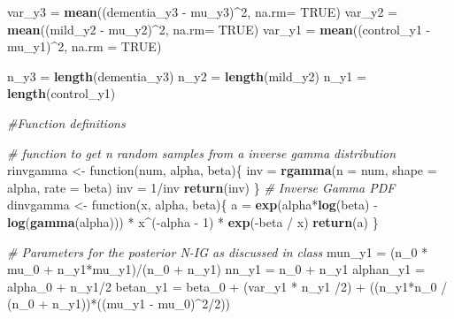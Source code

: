 \documentclass[]{article}
\newenvironment{Shaded}{\begin{snugshade}}{\end{snugshade}}
\newcommand{\KeywordTok}[1]{\textcolor[rgb]{0.13,0.29,0.53}{\textbf{{#1}}}}
\newcommand{\DataTypeTok}[1]{\textcolor[rgb]{0.13,0.29,0.53}{{#1}}}
\newcommand{\DecValTok}[1]{\textcolor[rgb]{0.00,0.00,0.81}{{#1}}}
\newcommand{\StringTok}[1]{\textcolor[rgb]{0.31,0.60,0.02}{{#1}}}
\newcommand{\CommentTok}[1]{\textcolor[rgb]{0.56,0.35,0.01}{\textit{{#1}}}}
\newcommand{\OtherTok}[1]{\textcolor[rgb]{0.56,0.35,0.01}{{#1}}}
\newcommand{\NormalTok}[1]{{#1}}
\begin{document}
\begin{Shaded}
\begin{Highlighting}[]
\NormalTok{var_y3 =}\StringTok{ }\KeywordTok{mean}\NormalTok{((dementia_y3 -}\StringTok{ }\NormalTok{mu_y3)^}\DecValTok{2}\NormalTok{, }\DataTypeTok{na.rm=} \OtherTok{TRUE}\NormalTok{)}
\NormalTok{var_y2 =}\StringTok{ }\KeywordTok{mean}\NormalTok{((mild_y2 -}\StringTok{ }\NormalTok{mu_y2)^}\DecValTok{2}\NormalTok{, }\DataTypeTok{na.rm=} \OtherTok{TRUE}\NormalTok{)}
\NormalTok{var_y1 =}\StringTok{ }\KeywordTok{mean}\NormalTok{((control_y1 -}\StringTok{ }\NormalTok{mu_y1)^}\DecValTok{2}\NormalTok{, }\DataTypeTok{na.rm =} \OtherTok{TRUE}\NormalTok{)}

\NormalTok{n_y3 =}\StringTok{ }\KeywordTok{length}\NormalTok{(dementia_y3)}
\NormalTok{n_y2 =}\StringTok{ }\KeywordTok{length}\NormalTok{(mild_y2)}
\NormalTok{n_y1 =}\StringTok{ }\KeywordTok{length}\NormalTok{(control_y1)}

\CommentTok{#Function definitions }

\CommentTok{# function to get n random samples from a inverse gamma distribution}
\NormalTok{rinvgamma <-}\StringTok{ }\NormalTok{function(num, alpha, beta)\{}
  \NormalTok{inv =}\StringTok{ }\KeywordTok{rgamma}\NormalTok{(}\DataTypeTok{n =} \NormalTok{num, }\DataTypeTok{shape =} \NormalTok{alpha, }\DataTypeTok{rate =} \NormalTok{beta)}
  \NormalTok{inv =}\StringTok{ }\DecValTok{1}\NormalTok{/inv}
  \KeywordTok{return}\NormalTok{(inv)}
\NormalTok{\}}
\CommentTok{# Inverse Gamma PDF}
\NormalTok{dinvgamma <-}\StringTok{ }\NormalTok{function(x, alpha, beta)\{}
  \NormalTok{a =}\StringTok{ }\KeywordTok{exp}\NormalTok{(alpha*}\KeywordTok{log}\NormalTok{(beta) -}\StringTok{ }\KeywordTok{log}\NormalTok{(}\KeywordTok{gamma}\NormalTok{(alpha))) *}\StringTok{ }\NormalTok{x^(-alpha -}\StringTok{ }\DecValTok{1}\NormalTok{) *}\StringTok{ }\KeywordTok{exp}\NormalTok{(-beta /}\StringTok{ }\NormalTok{x)}
  \KeywordTok{return}\NormalTok{(a)}
\NormalTok{\}}

\CommentTok{# Parameters for the posterior N-IG as discussed in class}
\NormalTok{mun_y1 =}\StringTok{ }\NormalTok{(n_0 *}\StringTok{ }\NormalTok{mu_0 +}\StringTok{ }\NormalTok{n_y1*mu_y1)/(n_0 +}\StringTok{ }\NormalTok{n_y1)}
\NormalTok{nn_y1 =}\StringTok{ }\NormalTok{n_0 +}\StringTok{ }\NormalTok{n_y1}
\NormalTok{alphan_y1 =}\StringTok{ }\NormalTok{alpha_0 +}\StringTok{ }\NormalTok{n_y1/}\DecValTok{2}
\NormalTok{betan_y1 =}\StringTok{ }\NormalTok{beta_0 +}\StringTok{ }\NormalTok{(var_y1 *}\StringTok{ }\NormalTok{n_y1 /}\DecValTok{2}\NormalTok{) +}\StringTok{ }\NormalTok{((n_y1*n_0 /}\StringTok{ }\NormalTok{(n_0 +}\StringTok{ }\NormalTok{n_y1))*((mu_y1 -}\StringTok{ }\NormalTok{mu_0)^}\DecValTok{2}\NormalTok{/}\DecValTok{2}\NormalTok{))}


\end{Highlighting}
\end{Shaded}
\end{document}
